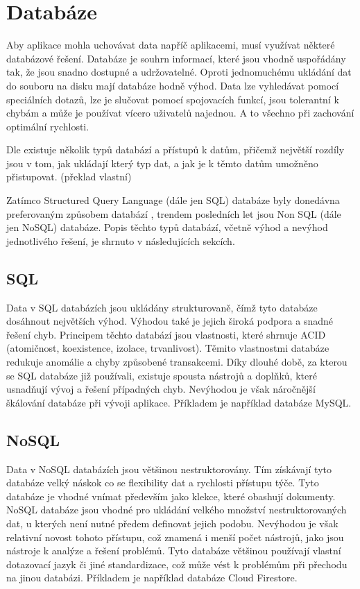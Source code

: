 \section{Databáze}

Aby aplikace mohla uchovávat data napříč aplikacemi,
musí využívat některé databázové řešení.
Databáze je souhrn informací,
které jsou vhodně uspořádány tak,
že jsou snadno dostupné a udržovatelné.
Oproti jednomuchému ukládání dat do souboru na disku mají databáze hodně výhod.
Data lze vyhledávat pomocí speciálních dotazů,
lze je slučovat pomocí spojovacích funkcí,
jsou tolerantní k chybám
a může je používat vícero uživatelů najednou.
A to všechno při zachování optimální rychlosti.
\cite{database}

Dle \cite{sql_nosql} existuje několik typů databází a přístupů k datům,
přičemž největší rozdíly jsou v tom,
jak ukládají který typ dat,
a jak je k těmto datům umožněno přistupovat.
\emph{}
\cite{sql_nosql} (překlad vlastní)

Zatímco Structured Query Language (dále jen SQL) databáze byly donedávna
preferovaným způsobem databází \cite{sql_nosql},
trendem posledních let jsou Non SQL (dále jen NoSQL) databáze.
Popis těchto typů databází,
včetně výhod a nevýhod jednotlivého řešení,
je shrnuto v následujících sekcích.

\subsection{SQL}

Data v SQL databázích jsou ukládány strukturovaně,
čímž tyto databáze dosáhnout největších výhod.
Výhodou také je jejich široká podpora a snadné řešení chyb.
Principem těchto databází jsou vlastnosti,
které shrnuje ACID (atomičnost, koexistence, izolace, trvanlivost).
Těmito vlastnostmi databáze redukuje anomálie a chyby způsobené transakcemi.
Díky dlouhé době,
za kterou se SQL databáze již používali,
existuje spousta nástrojů a doplňků,
které usnadňují vývoj a řešení případných chyb.
Nevýhodou je však náročnější škálování databáze při vývoji aplikace.
Příkladem je například databáze MySQL.
\cite{sql_nosql}

\subsection{NoSQL}

Data v NoSQL databázích jsou většinou nestruktorovány.
Tím získávají tyto databáze velký náskok co se flexibility dat a rychlosti
přístupu týče.
Tyto databáze je vhodné vnímat především jako klekce,
které obashují dokumenty. 
NoSQL databáze jsou vhodné pro ukládání velkého množství nestruktorovaných dat,
u kterých není nutné předem definovat jejich podobu.
Nevýhodou je však relativní novost tohoto přístupu,
což znamená i menší počet nástrojů,
jako jsou nástroje k analýze a řešení problémů.
Tyto databáze většinou používají vlastní dotazovací jazyk či jiné standardizace,
což může vést k problémům při přechodu na jinou databázi.
\cite{sql_nosql}
Příkladem je například databáze Cloud Firestore.
\cite{cloud_firestore}

